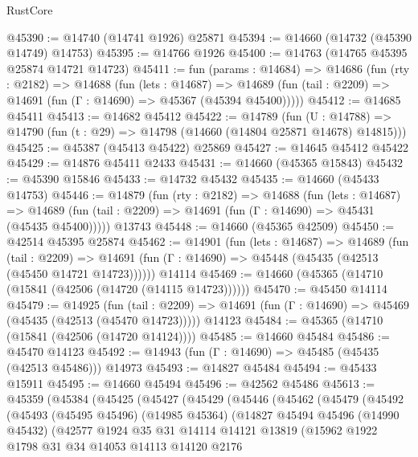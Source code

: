 \begin{lexlean}{RustCore}
\begin{coremodule}
@45390 := @14740 (@14741 @1926) @25871
@45394 := @14660 (@14732 (@45390 @14749) @14753)
@45395 := @14766 @1926
@45400 := @14763 (@14765 @45395 @25874 @14721 @14723)
@45411 := fun (params : @14684) =>
  @14686
    (fun (rty : @2182) =>
    @14688
      (fun (lets : @14687) =>
      @14689 (fun (tail : @2209) => @14691 (fun (Γ : @14690) => @45367 (@45394 @45400)))))
@45412 := @14685 @45411
@45413 := @14682 @45412
@45422 := @14789
    (fun (U : @14788) => @14790 (fun (t : @29) => @14798 (@14660 (@14804 @25871 @14678) @14815)))
@45425 := @45387 (@45413 @45422) @25869
@45427 := @14645 @45412 @45422
@45429 := @14876 @45411 @2433
@45431 := @14660 (@45365 @15843)
@45432 := @45390 @15846
@45433 := @14732 @45432
@45435 := @14660 (@45433 @14753)
@45446 := @14879
    (fun (rty : @2182) =>
    @14688
      (fun (lets : @14687) =>
      @14689 (fun (tail : @2209) => @14691 (fun (Γ : @14690) => @45431 (@45435 @45400)))))
    @13743
@45448 := @14660 (@45365 @42509)
@45450 := @42514 @45395 @25874
@45462 := @14901
    (fun (lets : @14687) =>
    @14689
      (fun (tail : @2209) =>
      @14691 (fun (Γ : @14690) => @45448 (@45435 (@42513 (@45450 @14721 @14723))))))
    @14114
@45469 := @14660 (@45365 (@14710 (@15841 (@42506 (@14720 (@14115 @14723))))))
@45470 := @45450 @14114
@45479 := @14925
    (fun (tail : @2209) => @14691 (fun (Γ : @14690) => @45469 (@45435 (@42513 (@45470 @14723)))))
    @14123
@45484 := @45365 (@14710 (@15841 (@42506 (@14720 @14124))))
@45485 := @14660 @45484
@45486 := @45470 @14123
@45492 := @14943 (fun (Γ : @14690) => @45485 (@45435 (@42513 @45486))) @14973
@45493 := @14827 @45484
@45494 := @45433 @15911
@45495 := @14660 @45494
@45496 := @42562 @45486
@45613 := @45359
    (@45384
      (@45425
        (@45427
          (@45429
            (@45446
              (@45462
                (@45479
                  (@45492
                    (@45493
                      (@45495 @45496)
                      (@14985 @45364)
                      (@14827
                        @45494
                        @45496
                        (@14990 @45432)
                        (@42577
                          @1924
                          @35
                          @31
                          @14114
                          @14121
                          @13819
                          (@15962
                            @1922
                            @1798
                            @31
                            @34
                            @14053
                            @14113
                            @14120
                            @2176

\end{coremodule}
\end{lexlean}
